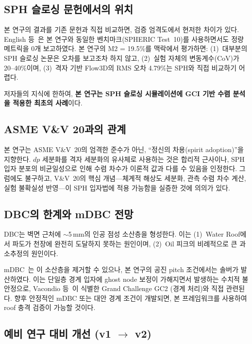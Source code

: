 \documentclass[11pt]{article}
\begin{document}
\subsection{SPH 슬로싱 문헌에서의 위치} \label{sec:positioning}

본 연구의 결과를 기존 문헌과 직접 비교하면, 검증 엄격도에서 현저한 차이가 있다.
English 등~\cite{English2022}은 본 연구와 동일한 벤치마크(SPHERIC Test~10)를
사용하면서도 정량 메트릭을 0개 보고하였다.
본 연구의 M2 = 19.5\%를 맥락에서 평가하면:
(1)~대부분의 SPH 슬로싱 논문은 오차를 보고조차 하지 않고,
(2)~실험 자체의 변동계수(CoV)가 20--40\%이며,
(3)~격자 기반 Flow3D의 RMS 오차 4.79\%는 SPH와 직접 비교하기 어렵다.

저자들의 지식에 한하여, \textbf{본 연구는 SPH 슬로싱 시뮬레이션에 GCI 기반
수렴 분석을 적용한 최초의 사례}이다.


\subsection{ASME V\&V 20과의 관계} \label{sec:vv20-rel}

본 연구는 ASME V\&V~20의 엄격한 준수가 아닌, ``정신의 차용(spirit adoption)''을
지향한다.
$dp$ 세분화를 격자 세분화의 유사체로 사용하는 것은 합리적 근사이나,
SPH 입자 분포의 비균일성으로 인해 수렴 차수가 이론적 값과 다를 수 있음을
인정한다.
그럼에도 불구하고, V\&V~20의 핵심 개념---체계적 해상도 세분화, 관측 수렴 차수 계산,
실험 불확실성 반영---이 SPH 입자법에 적용 가능함을 실증한 것에 의의가 있다.


\subsection{DBC의 한계와 mDBC 전망} \label{sec:dbc}

DBC는 벽면 근처에 $\sim$5\,mm의 인공 점성 소산층을 형성한다.
이는 (1)~Water Roof에서 파도가 천장에 완전히 도달하지 못하는 원인이며,
(2)~Oil 피크의 비례적으로 큰 과소추정의 원인이다.

mDBC~\cite{English2022}는 이 소산층을 제거할 수 있으나, 본 연구의 공진 pitch
조건에서는 솔버가 발산하였다. 이는 단일층 경계 입자에 ghost node 보정이
가해지면서 발생하는 수치적 불안정으로, Vacondio 등~\cite{Vacondio2020}이
식별한 Grand Challenge GC2 (경계 처리)와 직접 관련된다.
향후 안정적인 mDBC 또는 대안 경계 조건이 개발되면,
본 프레임워크를 사용하여 roof 충격 검증이 가능할 것이다.


\subsection{예비 연구 대비 개선 (v1 $\to$ v2)} \label{sec:v1v2}
\end{document}
